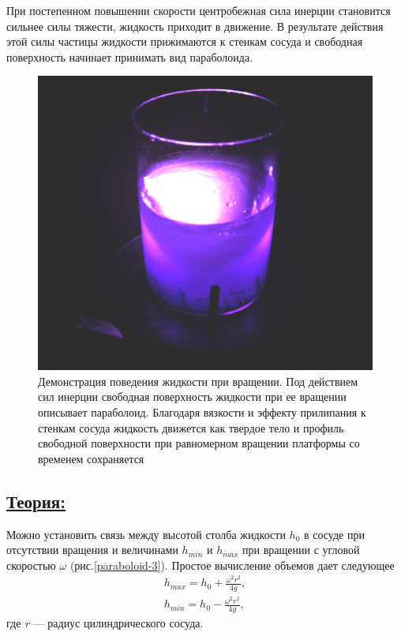 \documentclass[14pt,a4paper,oneside]{extarticle}	%
\begin{document}
При постепенном повышении скорости центробежная сила инерции становится сильнее силы тяжести, жидкость приходит в движение.
В результате действия этой силы частицы жидкости прижимаются к стенкам сосуда и свободная поверхность начинает принимать вид параболоида. 

\begin{figure}[H] 	
	\centering 	
	\includegraphics[width=0.6\linewidth]{paraboloid-2.png}
	\caption{Демонстрация поведения жидкости при вращении. Под действием сил инерции свободная поверхность жидкости при ее вращении описывает параболоид. Благодаря вязкости и эффекту прилипания к стенкам сосуда жидкость движется как твердое тело и профиль свободной поверхности при равномерном вращении платформы со временем сохраняется}
	\label{paraboloid-2}
\end{figure}

\newpage
\subsection*{\underline{Теория:}}

Можно установить связь между высотой столба жидкости $ h_{0} $ в сосуде при отсутствии вращения и величинами $ h_{min} $ и $ h_{max} $ при вращении с угловой скоростью $ \omega $ (рис.\ref{paraboloid-3}).
Простое вычисление объемов дает следующее
\begin{align}\label{1}
h_{max} = h_{0} + \frac{\omega^{2} r^{2}}{4g}, \\
h_{min} = h_{0} - \frac{\omega^{2} r^{2}}{4g},
\end{align}
где \textit{r} — радиус цилиндрического сосуда.
\end{document}
